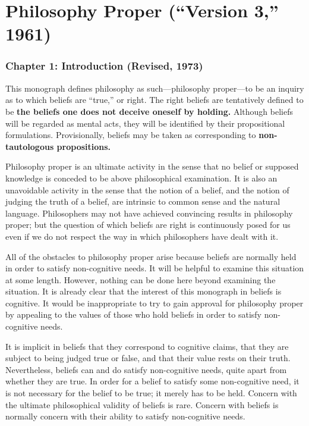 \newcommand{\stress}[1]{\textbf{#1}}

\chapter[Philosophy Proper (\enquote{Version 3,} 1961)][Philosophy Proper]{Philosophy Proper (\enquote{Version 3,} 1961)}
\subsection[Chapter 1: Introduction (Revised, 1973)][Introduction]{Chapter 1: Introduction (Revised, 1973)}

This monograph defines philosophy as such---philosophy proper---to be 
an inquiry as to which beliefs are \enquote{true,} or right. The right beliefs are 
tentatively defined to be \stress{the beliefs one does not deceive oneself by holding.}
Although beliefs will be regarded as mental acts, they will be identified by 
their propositional formulations. Provisionally, beliefs may be taken as 
corresponding to \stress{non-tautologous propositions.}

Philosophy proper is an ultimate activity in the sense that no belief or 
supposed knowledge is conceded to be above philosophical examination. It is 
also an unavoidable activity in the sense that the notion of a belief, and the 
notion of judging the truth of a belief, are intrinsic to common sense and the 
natural language. Philosophers may not have achieved convincing results in 
philosophy proper; but the question of which beliefs are right is 
continuously posed for us even if we do not respect the way in which 
philosophers have dealt with it. 

All of the obstacles to philosophy proper arise because beliefs are 
normally held in order to satisfy non-cognitive needs. It will be helpful to 
examine this situation at some length. However, nothing can be done here 
beyond examining the situation. It is already clear that the interest of this 
monograph in beliefs is cognitive. It would be inappropriate to try to gain 
approval for philosophy proper by appealing to the values of those who hold 
beliefs in order to satisfy non-cognitive needs. 

It is implicit in beliefs that they correspond to cognitive claims, that 
they are subject to being judged true or false, and that their value rests on 
their truth. Nevertheless, beliefs can and do satisfy non-cognitive needs, 
quite apart from whether they are true. In order for a belief to satisfy some 
non-cognitive need, it is not necessary for the belief to be true; it merely has 
to be held. Concern with the ultimate philosophical validity of beliefs is rare. 
Concern with beliefs is normally concern with their ability to satisfy 
non-cognitive needs. 

